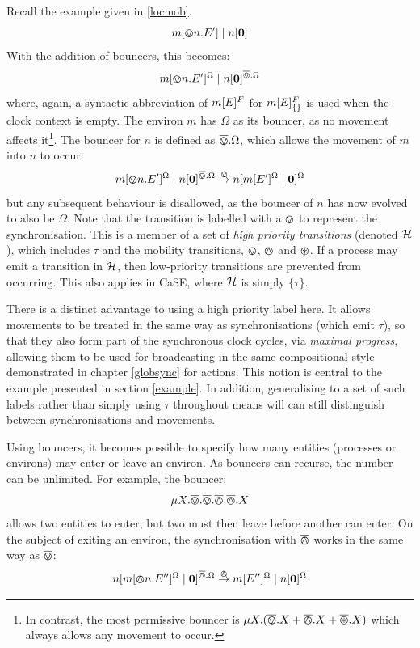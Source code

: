 Recall the example given in \ref{locmob}.
\begin{equation}
{m}[ \varovee n.E^\prime ]\;|\;{n}[ \textbf{0} ]
\end{equation}
With the addition of bouncers, this becomes:
\begin{equation}
{m}[ \varovee n.E^\prime ]^{\Omega}\;|\;{n}[ \textbf{0} ]^{\overline{\varovee}.\Omega}
\end{equation}
where, again, a syntactic abbreviation of ${m}[ E ]^{F}$ for
${m}[ E ]^{F}_{\{\}}$ is used when the clock context is empty. The environ
$m$ has $\Omega$ as its bouncer, as no movement affects it\footnote{In
  contrast, the most permissive bouncer is $\mu X.(\overline{\varovee} .X + \overline{\varowedge} .X
  + \overline{\varoast} .X)$ which always allows any movement to occur.}.  The
bouncer for $n$ is defined as $\overline{\varovee}.\Omega$, which allows the movement
of $m$ into $n$ to occur:
\begin{equation}
{m}[ \varovee n.E^\prime ]^{\Omega}\;|\;{n}[ \textbf{0} ]^{\overline{\varovee}.\Omega}
 \stackrel{\varovee}{\rightarrow}
{n}[ {m}[ E^\prime ]^{\Omega} \;|\; \textbf{0} ]^{\Omega}
\end{equation}
but any subsequent behaviour is disallowed, as the bouncer of $n$ has
now evolved to also be $\Omega$.  Note that the transition is labelled
with a $\varovee$ to represent the synchronisation.  This is a member of a
set of \emph{high priority transitions} (denoted $\text{$\mathcal{H}$}$), which
includes $\tau$ and the mobility transitions, $\varovee$, $\varowedge$ and
$\varoast$.  If a process may emit a transition in $\text{$\mathcal{H}$}$, then
low-priority transitions are prevented from occurring.  This also
applies in CaSE, where $\text{$\mathcal{H}$}$ is simply $\{ \tau \}$.  

There is a distinct advantage to using a high priority label here.  It
allows movements to be treated in the same way as synchronisations
(which emit $\tau$), so that they also form part of the synchronous
clock cycles, via \emph{maximal progress}, allowing them to be used for
broadcasting in the same compositional style demonstrated in chapter
\ref{globsync} for actions.  This notion is central to the example
presented in section \ref{example}.  In addition, generalising to a set
of such labels rather than simply using $\tau$ throughout means will can
still distinguish between synchronisations and movements.

Using bouncers, it becomes possible to specify how many entities
(processes or environs) may enter or leave an environ.  As bouncers
can recurse, the number can be unlimited.  For example, the bouncer:
\begin{equation}
\mu X.\overline{\varovee}.\overline{\varovee}.\overline{\varowedge}.\overline{\varowedge}.X
\end{equation}
allows two entities to enter, but two must then leave before another
can enter.  On the subject of exiting an environ, the synchronisation
with $\overline{\varowedge}$ works in the same way as $\overline{\varovee}$:
\begin{equation}
{n}[ {m}[ \varowedge n.E^{\prime \prime} ]^{\Omega} \;|\; \textbf{0} ]^{\overline{\varowedge}.\Omega}
 \stackrel{\varowedge}{\rightarrow}
{m}[ E^{\prime \prime} ]^{\Omega} \;|\; {n}[ \textbf{0} ]^{\Omega}
\end{equation}

